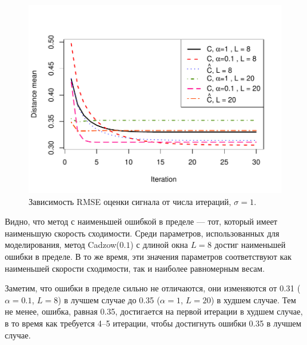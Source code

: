 \documentclass[12pt, specialist, subf,href,colorlinks=true,substylefile = spbu.rtx]{disser}
\theoremstyle{remark}
\theoremstyle{definition}
\begin{document}
\begin{figure}[!hhh]
	\includegraphics[width = \columnwidth]{cadzowspeed_2.pdf}
	\caption{Зависимость RMSE оценки сигнала от числа итераций, $\sigma = 1$.}
	\label{img_cadzowspeed2}
\end{figure}

Видно, что метод с наименьшей ошибкой в пределе --- тот, который имеет наименьшую скорость сходимости. Среди параметров, использованных для моделирования,  метод Cadzow($0.1$) с длиной окна $L=8$ достиг наименьшей ошибки в пределе. В то же время, эти значения параметров соответствуют как наименьшей скорости сходимости, так и наиболее равномерным весам.

Заметим, что ошибки в пределе сильно не отличаются, они изменяются от 0.31 ($\alpha=0.1$, $L=8$) в лучшем случае до 0.35 ($\alpha=1$, $L=20$) в худшем случае. Тем не менее, ошибка, равная 0.35, достигается на первой итерации в худшем случае, в то время как требуется 4--5 итерации, чтобы достигнуть ошибки 0.35 в лучшем случае.
\end{document}
